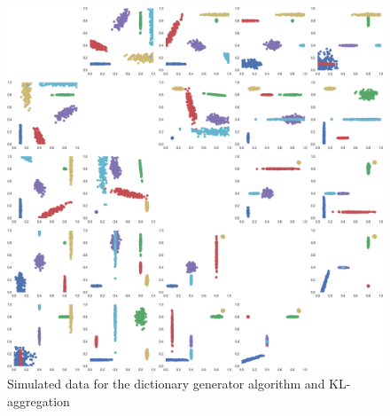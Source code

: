 \begin{figure}
\center
    \includegraphics[width=\textwidth]{./TeX_files/experiments_data.png}
    \caption{Simulated data for the dictionary generator algorithm and KL-aggregation}
    \label{fig:experiments_data}
\end{figure}

